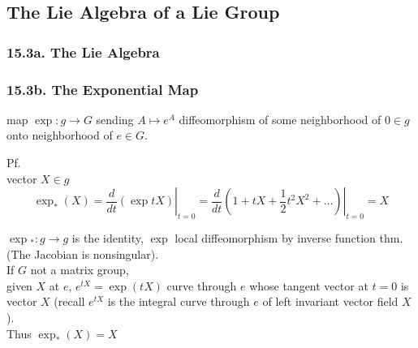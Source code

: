 \subsection{The Lie Algebra of a Lie Group}

\subsubsection{15.3a. The Lie Algebra}

\subsubsection{15.3b. The Exponential Map}

\begin{theorem}[15.27] map $\exp : g \to G$ sending $A \mapsto e^A$ diffeomorphism of some neighborhood of $0\in g$ onto neighborhood of $e \in G$.  
\end{theorem}

Pf. \\
        vector $X \in g$ \\
        \[
\exp_*(X) = \left. \frac{d}{dt} (\exp{ tX}) \right|_{t=0} = \frac{d}{dt} \left. \left( 1 + tX + \frac{1}{2} t^2 X^2 + \dots \right) \right|_{t=0} = X
\]

$\exp{}_* : g \to g$ is the identity, $\exp{}$ local diffeomorphism by inverse function thm. (The Jacobian is nonsingular).   \\

If $G$ not a matrix group, \\
given $X$ at $e$, $e^{tX} = \exp{(tX)}$ curve through $e$ whose tangent vector at $t=0$ is vector $X$ (recall $e^{tX}$ is the integral curve through $e$ of left invariant vector field $X$).  \\
Thus $\exp_*{(X)} = X$

